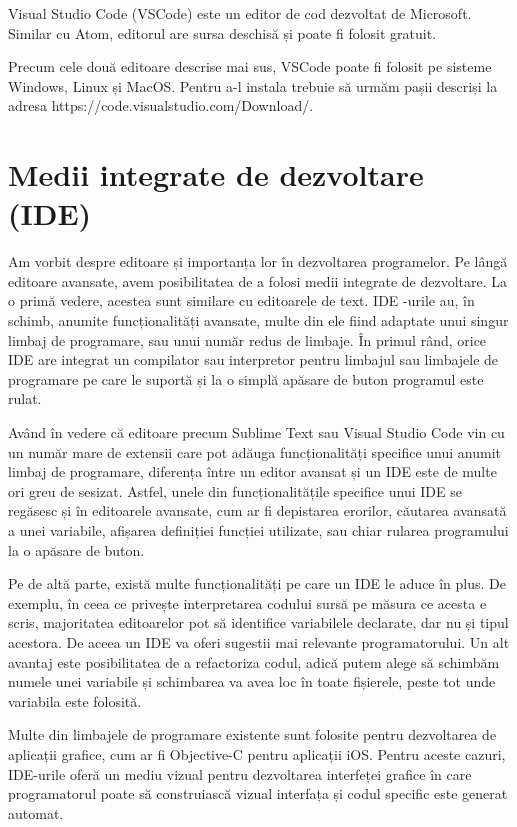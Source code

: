 Visual Studio Code (VSCode) este un editor de cod dezvoltat de Microsoft.
Similar cu Atom, editorul are sursa deschisă și poate fi folosit gratuit.

Precum cele două editoare descrise mai sus, VSCode poate fi folosit pe sisteme
Windows, Linux și MacOS. Pentru a-l instala trebuie să urmăm pașii descriși la
adresa https://code.visualstudio.com/Download/.

\section{Medii integrate de dezvoltare (IDE)}
\label{sec:appdev-ide}

Am vorbit despre editoare și importanța lor în dezvoltarea programelor. Pe lângă
editoare avansate, avem posibilitatea de a folosi medii integrate de dezvoltare.
La o primă vedere, acestea sunt similare cu editoarele de text. IDE
-urile au, în schimb, anumite
funcționalități avansate, multe din ele fiind adaptate unui singur limbaj de
programare, sau unui număr redus de limbaje. În primul rând, orice IDE are
integrat un compilator sau interpretor pentru limbajul sau limbajele de
programare pe care le suportă și la o simplă apăsare de buton programul este
rulat.

Având în vedere că editoare precum Sublime Text sau Visual Studio Code vin cu un
număr mare de extensii care pot adăuga funcționalități specifice unui anumit
limbaj de programare, diferența între un editor avansat și un IDE este de multe
ori greu de sesizat. Astfel, unele din funcționalitățile specifice unui IDE se
regăsesc și în editoarele avansate, cum ar fi depistarea erorilor, căutarea
avansată a unei variabile, afișarea definiției funcției utilizate, sau chiar
rularea programului la o apăsare de buton.

Pe de altă parte, există multe funcționalități pe care un IDE le aduce în plus.
De exemplu, în ceea ce privește interpretarea codului sursă pe măsura ce acesta
e scris, majoritatea editoarelor pot să identifice variabilele declarate, dar nu
și tipul acestora. De aceea un IDE va oferi sugestii mai relevante
programatorului. Un alt avantaj este posibilitatea de a refactoriza codul, adică
putem alege să schimbăm numele unei variabile și schimbarea va avea loc în toate
fișierele, peste tot unde variabila este folosită.

Multe din limbajele de programare existente sunt folosite pentru dezvoltarea de
aplicații grafice, cum ar fi Objective-C pentru aplicații iOS. Pentru aceste
cazuri, IDE-urile oferă un mediu vizual pentru dezvoltarea interfeței grafice în
care programatorul poate să construiască vizual interfața și codul specific este
generat automat.

